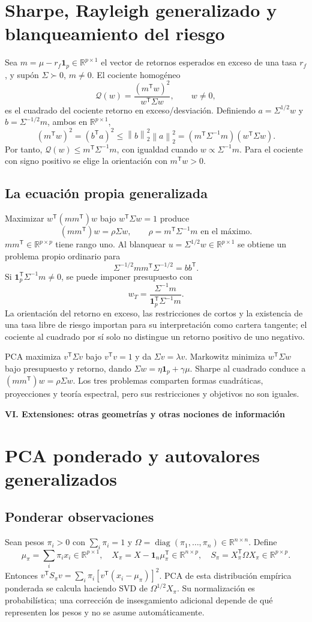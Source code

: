 \documentclass[11pt,a4paper]{article}
\newcommand{\R}{\mathbb R}
\newcommand{\T}{^{\mathsf T}}
\newcommand{\norm}[1]{\left\lVert #1\right\rVert}
\DeclareMathOperator{\diag}{diag}
\newcommand{\ones}{\mathbf 1}
\theoremstyle{definition}
\newcommand{\parte}[1]{\par\bigskip\Needspace{8\baselineskip}\begin{center}{\Large\bfseries\color{azul}#1}\end{center}}
\begin{document}
\section{Sharpe, Rayleigh generalizado y blanqueamiento del riesgo}
Sea $m=\mu-r_f\ones_p\in\R^{p\times1}$ el vector de retornos esperados en exceso de una tasa $r_f$, y supón $\Sigma\succ0$, $m\ne0$. El cociente homogéneo
\[
\mathcal Q(w)=\frac{(m\T w)^2}{w\T\Sigma w},\qquad w\ne0,
\]
es el cuadrado del cociente retorno en exceso/desviación. Definiendo $a=\Sigma^{1/2}w$ y $b=\Sigma^{-1/2}m$, ambos en $\R^{p\times1}$,
\[
(m\T w)^2=(b\T a)^2\le\norm b_2^2\norm a_2^2
=(m\T\Sigma^{-1}m)(w\T\Sigma w).
\]
Por tanto, $\mathcal Q(w)\le m\T\Sigma^{-1}m$, con igualdad cuando $w\propto\Sigma^{-1}m$. Para el cociente con signo positivo se elige la orientación con $m\T w>0$.
\subsection{La ecuación propia generalizada}
Maximizar $w\T(mm\T)w$ bajo $w\T\Sigma w=1$ produce
\[
\boxed{(mm\T)w=\rho\Sigma w},\qquad \rho=m\T\Sigma^{-1}m\text{ en el máximo}.
\]
$mm\T\in\R^{p\times p}$ tiene rango uno. Al blanquear $u=\Sigma^{1/2}w\in\R^{p\times1}$ se obtiene un problema propio ordinario para
\[
\Sigma^{-1/2}mm\T\Sigma^{-1/2}=bb\T.
\]
Si $\ones_p\T\Sigma^{-1}m\ne0$, se puede imponer presupuesto con
\[
w_T=\frac{\Sigma^{-1}m}{\ones_p\T\Sigma^{-1}m}.
\]
La orientación del retorno en exceso, las restricciones de cortos y la existencia de una tasa libre de riesgo importan para su interpretación como cartera tangente; el cociente al cuadrado por sí solo no distingue un retorno positivo de uno negativo.
\begin{idea}
PCA maximiza $v\T\Sigma v$ bajo $v\T v=1$ y da $\Sigma v=\lambda v$. Markowitz minimiza $w\T\Sigma w$ bajo presupuesto y retorno, dando $\Sigma w=\eta\ones_p+\gamma\mu$. Sharpe al cuadrado conduce a $(mm\T)w=\rho\Sigma w$. Los tres problemas comparten formas cuadráticas, proyecciones y teoría espectral, pero sus restricciones y objetivos no son iguales.
\end{idea}

\parte{VI. Extensiones: otras geometrías y otras nociones de información}
\section{PCA ponderado y autovalores generalizados}
\subsection{Ponderar observaciones}
Sean pesos $\pi_i>0$ con $\sum_i\pi_i=1$ y $\Omega=\diag(\pi_1,\ldots,\pi_n)\in\R^{n\times n}$. Define
\[
\mu_\pi=\sum_i\pi_i x_i\in\R^{p\times1},\quad
X_\pi=X-\ones_n\mu_\pi\T\in\R^{n\times p},\quad
S_\pi=X_\pi\T\Omega X_\pi\in\R^{p\times p}.
\]
Entonces $v\T S_\pi v=\sum_i\pi_i[v\T(x_i-\mu_\pi)]^2$. PCA de esta distribución empírica ponderada se calcula haciendo SVD de $\Omega^{1/2}X_\pi$. Su normalización es probabilística; una corrección de insesgamiento adicional depende de qué representen los pesos y no se asume automáticamente.
\end{document}

